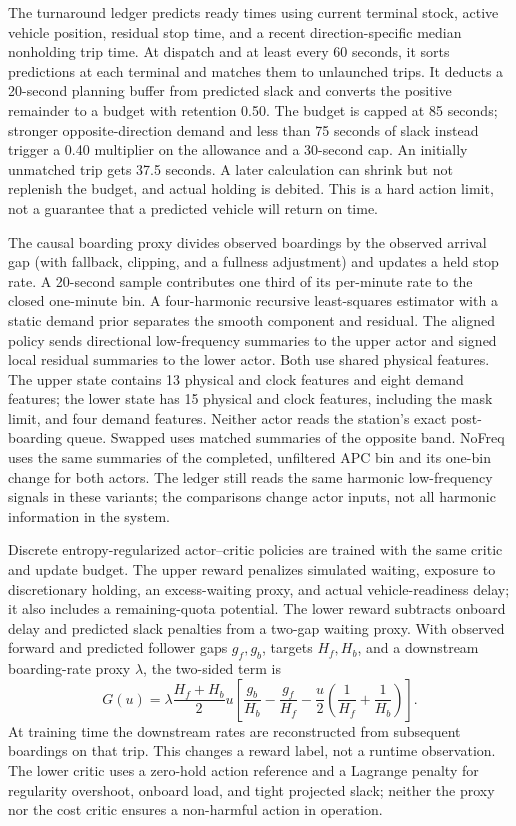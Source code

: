 The turnaround ledger predicts ready times using current terminal stock, active vehicle position, residual stop time, and a recent direction-specific median nonholding trip time. At dispatch and at least every 60 seconds, it sorts predictions at each terminal and matches them to unlaunched trips. It deducts a 20-second planning buffer from predicted slack and converts the positive remainder to a budget with retention 0.50. The budget is capped at 85 seconds; stronger opposite-direction demand and less than 75 seconds of slack instead trigger a 0.40 multiplier on the allowance and a 30-second cap. An initially unmatched trip gets 37.5 seconds. A later calculation can shrink but not replenish the budget, and actual holding is debited. This is a hard action limit, not a guarantee that a predicted vehicle will return on time.

The causal boarding proxy divides observed boardings by the observed arrival gap (with fallback, clipping, and a fullness adjustment) and updates a held stop rate. A 20-second sample contributes one third of its per-minute rate to the closed one-minute bin. A four-harmonic recursive least-squares estimator with a static demand prior separates the smooth component and residual. The aligned policy sends directional low-frequency summaries to the upper actor and signed local residual summaries to the lower actor. Both use shared physical features. The upper state contains 13 physical and clock features and eight demand features; the lower state has 15 physical and clock features, including the mask limit, and four demand features. Neither actor reads the station's exact post-boarding queue. Swapped uses matched summaries of the opposite band. NoFreq uses the same summaries of the completed, unfiltered APC bin and its one-bin change for both actors. The ledger still reads the same harmonic low-frequency signals in these variants; the comparisons change actor inputs, not all harmonic information in the system.

Discrete entropy-regularized actor--critic policies \citep{haarnoja2018soft,christodoulou2019discrete} are trained with the same critic and update budget. The upper reward penalizes simulated waiting, exposure to discretionary holding, an excess-waiting proxy, and actual vehicle-readiness delay; it also includes a remaining-quota potential. The lower reward subtracts onboard delay and predicted slack penalties from a two-gap waiting proxy. With observed forward and predicted follower gaps $g_f,g_b$, targets $H_f,H_b$, and a downstream boarding-rate proxy $\lambda$, the two-sided term is
\begin{equation}
G(u)=\lambda\frac{H_f+H_b}{2}u
  \left[\frac{g_b}{H_b}-\frac{g_f}{H_f}
    -\frac{u}{2}\left(\frac1{H_f}+\frac1{H_b}\right)\right].
\end{equation}
At training time the downstream rates are reconstructed from subsequent boardings on that trip. This changes a reward label, not a runtime observation. The lower critic uses a zero-hold action reference and a Lagrange penalty for regularity overshoot, onboard load, and tight projected slack; neither the proxy nor the cost critic ensures a non-harmful action in operation.

